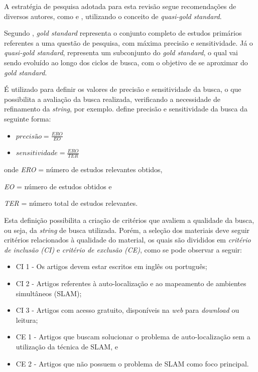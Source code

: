 		A estratégia de pesquisa adotada para esta revisão segue recomendações de diversos autores, como \cite{Kitchenham} e \cite{systematicReviewEngSoft}, utilizando o conceito de \textit{quasi-gold standard}.

		Segundo \cite{quasi_goldES}, \textit{gold standard} representa o conjunto completo de estudos primários referentes a uma questão de pesquisa, com máxima precisão e sensitividade. Já o \textit{quasi-gold standard}, representa um subconjunto do \textit{gold standard}, o qual vai sendo evoluído ao longo dos ciclos de busca, com o objetivo de se aproximar do \textit{gold standard}.

		É utilizado para definir os valores de precisão e sensitividade da busca, o que possibilita a avaliação da busca realizada, verificando a necessidade de refinamento da \textit{string}, por exemplo. \cite{quasi_goldES} define precisão e sensitividade da busca da seguinte forma:

		\begin{itemize}

			\item $precisão = \frac{ERO}{EO}$

			\item $sensitividade = \frac{ERO}{TER}$
		\end{itemize}

		onde \textit{ERO} = número de estudos relevantes obtidos,

		\textit{EO} = número de estudos obtidos e

		\textit{TER} = número total de estudos relevantes.

		Esta definição possibilita a criação de critérios que avaliem a qualidade da busca, ou seja, da \textit{string} de busca utilizada. Porém, a seleção dos materiais deve seguir critérios relacionados à qualidade do material, os quais são divididos em \textit{critério de inclusão (CI)} e \textit{critério de exclusão (CE)}, como se pode observar a seguir:

		\begin{itemize}
			\item CI 1 - Os artigos devem estar escritos em inglês ou português;
			\item CI 2 - Artigos referentes à auto-localização e ao mapeamento de ambientes simultâneos (SLAM);
			\item CI 3 - Artigos com acesso gratuito, disponíveis na \textit{web} para \textit{download} ou leitura;
			\item CE 1 - Artigos que buscam solucionar o problema de auto-localização sem a utilização da técnica de SLAM, e
			\item CE 2 - Artigos que não possuem o problema de SLAM como foco principal.
		\end{itemize}

